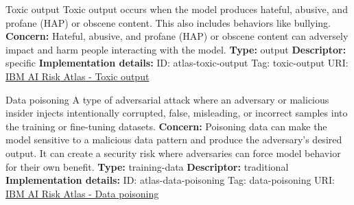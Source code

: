 \documentclass[a4paper,12pt]{article}
\begin{document}
\begin{definitionbox}{Toxic output}
Toxic output occurs when the model produces hateful, abusive, and profane (HAP) or obscene content. This also includes behaviors like bullying.\newline\newline
\textbf{Concern: }Hateful, abusive, and profane (HAP) or obscene content can adversely impact and harm people interacting with the model.\newline\newline
\textbf{Type: }output\newline
\textbf{Descriptor: }specific \newline\newline
\textbf{Implementation details: } \newline
ID: atlas-toxic-output \newline
Tag: toxic-output \newline
URI:  \href{https://www.ibm.com/docs/en/watsonx/saas?topic=SSYOK8/wsj/ai-risk-atlas/toxic-output.html}{IBM AI Risk Atlas - Toxic output}\newline
\end{definitionbox}
\begin{definitionbox}{Data poisoning}
A type of adversarial attack where an adversary or malicious insider injects intentionally corrupted, false, misleading, or incorrect samples into the training or fine-tuning datasets.\newline\newline
\textbf{Concern: }Poisoning data can make the model sensitive to a malicious data pattern and produce the adversary's desired output. It can create a security risk where adversaries can force model behavior for their own benefit.\newline\newline
\textbf{Type: }training-data\newline
\textbf{Descriptor: }traditional \newline\newline
\textbf{Implementation details: } \newline
ID: atlas-data-poisoning \newline
Tag: data-poisoning \newline
URI:  \href{https://www.ibm.com/docs/en/watsonx/saas?topic=SSYOK8/wsj/ai-risk-atlas/data-poisoning.html}{IBM AI Risk Atlas - Data poisoning}\newline
\end{definitionbox}
\end{document}

